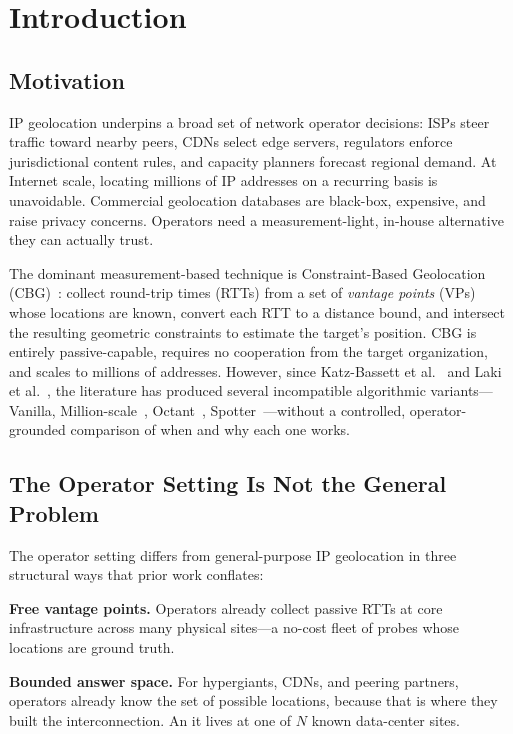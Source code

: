 \section{Introduction}
\label{sec:intro}

\subsection{Motivation}

IP geolocation underpins a broad set of network operator decisions: ISPs steer traffic toward
nearby peers, CDNs select edge servers, regulators enforce jurisdictional content rules, and
capacity planners forecast regional demand. At Internet scale, locating millions of IP addresses
on a recurring basis is unavoidable. Commercial geolocation databases are black-box, expensive,
and raise privacy concerns. Operators need a measurement-light, in-house alternative they can
actually trust.

The dominant measurement-based technique is Constraint-Based Geolocation (CBG)~\cite{gueye2006constraint,katz2006towards}: collect round-trip
times (RTTs) from a set of \emph{vantage points} (VPs) whose locations are known, convert each
RTT to a distance bound, and intersect the resulting geometric constraints to estimate the
target's position. CBG is entirely passive-capable, requires no cooperation from the target
organization, and scales to millions of addresses. However, since Katz-Bassett et al.~\cite{katz2006towards}
and Laki et al.~\cite{laki2011spotter}, the literature has produced several
incompatible algorithmic variants---Vanilla, Million-scale~\cite{poese2011ip}, Octant~\cite{wong2007octant},
Spotter~\cite{laki2011spotter}---without a controlled, operator-grounded comparison of when
and why each one works.

\subsection{The Operator Setting Is Not the General Problem}
\label{sec:intro-operator}

The operator setting differs from general-purpose IP geolocation in three structural ways that
prior work conflates:

\textbf{Free vantage points.} Operators already collect passive RTTs at core infrastructure
across many physical sites---a no-cost fleet of probes whose locations are ground truth.

\textbf{Bounded answer space.} For hypergiants, CDNs, and peering partners, operators already
know the set of possible locations, because that is where they built the interconnection. An
it lives at one of $N$ known data-center sites.


